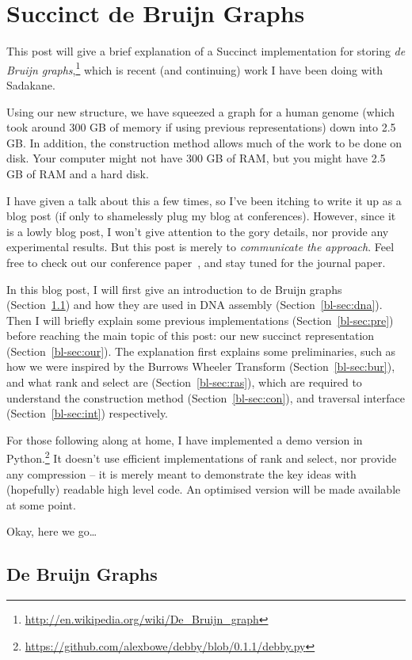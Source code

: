 \chapter{Succinct de Bruijn Graphs}

This post will give a brief explanation of a Succinct implementation for storing \emph{de Bruijn graphs},\footnote{\url{http://en.wikipedia.org/wiki/De_Bruijn_graph}} which is recent (and continuing) work I have been doing with Sadakane.

Using our new structure, we have squeezed a graph for a human genome (which took around 300 GB of memory if using previous representations) down into 2.5 GB. In addition, the construction method allows much of the work to be done on disk. Your computer might not have 300 GB of RAM, but you might have 2.5 GB of RAM and a hard disk.

I have given a talk about this a few times, so I've been itching to write it up as a blog post (if only to shamelessly plug my blog at conferences). However, since it is a lowly blog post, I won't give attention to the gory details, nor provide any experimental results. But this post is merely to \emph{communicate the approach}. Feel free to check out our conference paper~\cite{bowe}, and stay tuned for the journal paper.

In this blog post, I will first give an introduction to de Bruijn graphs (Section~\ref{bl-sec:dbg}) and how they are used in DNA assembly (Section~\ref{bl-sec:dna}). Then I will briefly explain some previous implementations (Section~\ref{bl-sec:pre}) before reaching the main topic of this post: our new succinct representation (Section~\ref{bl-sec:our}). The explanation first explains some preliminaries, such as how we were inspired by the Burrows Wheeler Transform (Section~\ref{bl-sec:bur}), and what rank and select are (Section~\ref{bl-sec:ras}), which are required to understand the construction method (Section~\ref{bl-sec:con}), and traversal interface (Section~\ref{bl-sec:int}) respectively.

For those following along at home, I have implemented a demo version in Python.\footnote{\url{https://github.com/alexbowe/debby/blob/0.1.1/debby.py}} It doesn't use efficient implementations of rank and select, nor provide any compression -- it is merely meant to demonstrate the key ideas with (hopefully) readable high level code. An optimised version will be made available at some point.

Okay, here we go\ldots

\section{De Bruijn Graphs}\label{bl-sec:dbg}

